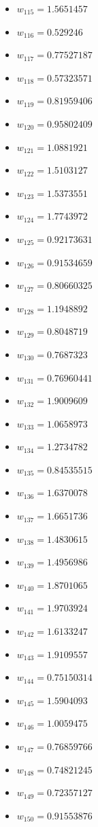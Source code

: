 \documentclass[11pt]{article}
\begin{document}
\begin{itemize}
\item $w_{115} = 1.5651457$
\item $w_{116} = 0.529246$
\item $w_{117} = 0.77527187$
\item $w_{118} = 0.57323571$
\item $w_{119} = 0.81959406$
\item $w_{120} = 0.95802409$
\item $w_{121} = 1.0881921$
\item $w_{122} = 1.5103127$
\item $w_{123} = 1.5373551$
\item $w_{124} = 1.7743972$
\item $w_{125} = 0.92173631$
\item $w_{126} = 0.91534659$
\item $w_{127} = 0.80660325$
\item $w_{128} = 1.1948892$
\item $w_{129} = 0.8048719$
\item $w_{130} = 0.7687323$
\item $w_{131} = 0.76960441$
\item $w_{132} = 1.9009609$
\item $w_{133} = 1.0658973$
\item $w_{134} = 1.2734782$
\item $w_{135} = 0.84535515$
\item $w_{136} = 1.6370078$
\item $w_{137} = 1.6651736$
\item $w_{138} = 1.4830615$
\item $w_{139} = 1.4956986$
\item $w_{140} = 1.8701065$
\item $w_{141} = 1.9703924$
\item $w_{142} = 1.6133247$
\item $w_{143} = 1.9109557$
\item $w_{144} = 0.75150314$
\item $w_{145} = 1.5904093$
\item $w_{146} = 1.0059475$
\item $w_{147} = 0.76859766$
\item $w_{148} = 0.74821245$
\item $w_{149} = 0.72357127$
\item $w_{150} = 0.91553876$
\end{itemize}
\end{document}
